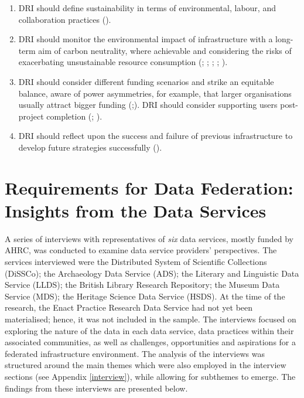 \documentclass[11pt]{scrartcl}
\begin{document}
\begin{enumerate}[resume]
\item DRI should define sustainability in terms of environmental, labour, and collaboration practices 
(\cite[1]{ross_2024_13710266}).   

\item DRI should monitor the environmental impact of infrastructure with a long-term aim of carbon neutrality, where achievable and considering the risks of exacerbating unsustainable resource consumption 
(\cite[7]{bell_2025_17099176}; \cite[13]{Black19102024}; \cite[29]{ross_2024_13710266}; \cite[21]{Zwiggelaar22}; \cite[2]{hawkins_2024_14006955}).  

\item DRI should consider different funding scenarios and 
strike an equitable balance, aware of power asymmetries, for example, that larger organisations usually attract bigger funding 
(\cite[21]{romanova_2021_5105938};\cite{duran_del_fierro_2025_17641455}). 
DRI should consider supporting users post-project completion
(\cite[14]{de_roure_2022_4716148}; \cite[41]{taylor_2022_10518740}). 
 

\item DRI should reflect upon the success and failure of previous infrastructure to develop future strategies successfully 
(\cite[21]{romanova_2021_5105938}).

\end{enumerate}
\section{Requirements for Data Federation: Insights from the Data Services}
A series of interviews with representatives of \emph{six} data services, mostly funded by AHRC, was conducted to examine data service providers' perspectives. The services interviewed were the Distributed System of Scientific Collections (DiSSCo); the Archaeology Data Service (ADS); the Literary and Linguistic Data Service (LLDS); the British Library Research Repository; the Museum Data Service (MDS); the Heritage Science Data Service (HSDS). At the time of the research, the Enact Practice Research Data Service had not yet been materialised; hence, it was not included in the sample. 
The interviews focused on exploring the nature of the data in each data service, data practices within their associated communities, as well as challenges, opportunities and aspirations for a federated infrastructure environment.  The analysis of the interviews was structured around the main themes which were also employed in the interview sections (see Appendix \ref{interview}), while allowing for subthemes to emerge. The findings from these interviews are presented below.
\end{document}
